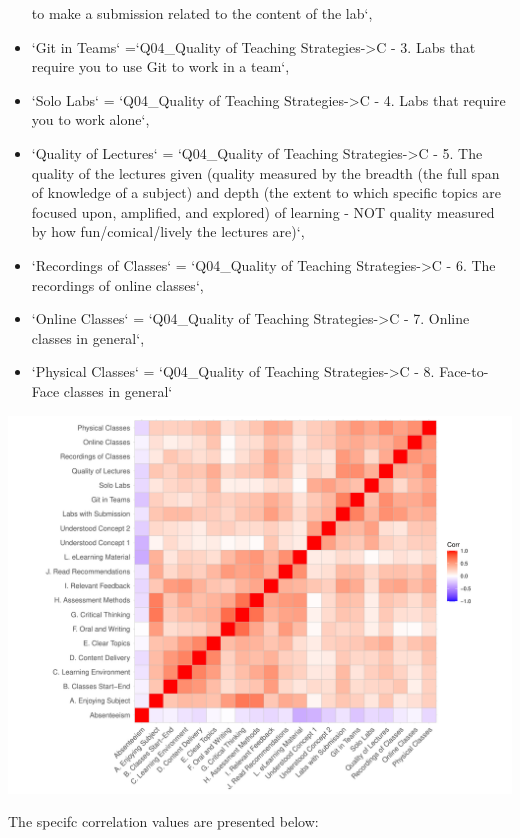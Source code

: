 \documentclass[
]{article}
\begin{document}
\begin{itemize}
  to make a submission related to the content of the lab`,
\item
  `Git in Teams` =`Q04\_Quality of Teaching Strategies-\textgreater C -
  3. Labs that require you to use Git to work in a team`,
\item
  `Solo Labs` = `Q04\_Quality of Teaching Strategies-\textgreater C - 4.
  Labs that require you to work alone`,
\item
  `Quality of Lectures` = `Q04\_Quality of Teaching
  Strategies-\textgreater C - 5. The quality of the lectures given
  (quality measured by the breadth (the full span of knowledge of a
  subject) and depth (the extent to which specific topics are focused
  upon, amplified, and explored) of learning - NOT quality measured by
  how fun/comical/lively the lectures are)`,
\item
  `Recordings of Classes` = `Q04\_Quality of Teaching
  Strategies-\textgreater C - 6. The recordings of online classes`,
\item
  `Online Classes` = `Q04\_Quality of Teaching Strategies-\textgreater C
  - 7. Online classes in general`,
\item
  `Physical Classes` = `Q04\_Quality of Teaching
  Strategies-\textgreater C - 8. Face-to-Face classes in general`
\end{itemize}

\includegraphics{AnalysisOfCourseEvaluation-Notebook_files/figure-latex/CorrelationMatrixWithoutFigures-1.pdf}

The specifc correlation values are presented below:
\end{document}
